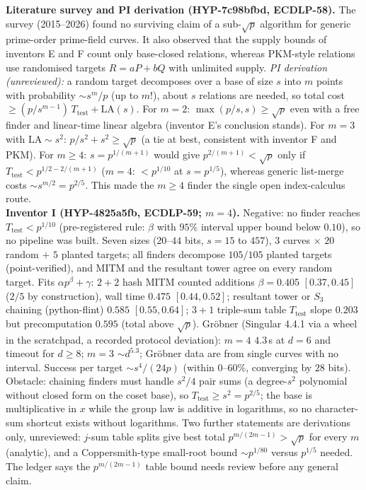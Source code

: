\documentclass[11pt,a4paper]{article}
\theoremstyle{remark}
\begin{document}
\textbf{Literature survey and PI derivation (\mbox{HYP-7c98bfbd}, ECDLP-58).} The survey (2015--2026) found no surviving claim of a sub-$\sqrt p$ algorithm for generic prime-order prime-field curves. It also observed that the supply bounds of inventors E and F count only base-closed relations, whereas PKM-style relations use randomised targets $R=aP+bQ$ with unlimited supply. \emph{PI derivation (unreviewed):} a random target decomposes over a base of size $s$ into $m$ points with probability $\sim s^m/p$ (up to $m!$), about $s$ relations are needed, so total cost $\ge(p/s^{m-1})\,T_{\mathrm{test}}+\mathrm{LA}(s)$. For $m=2$: $\max(p/s,s)\ge\sqrt p$ even with a free finder and linear-time linear algebra (inventor E's conclusion stands). For $m=3$ with $\mathrm{LA}\sim s^2$: $p/s^2+s^2\ge\sqrt p$ (a tie at best, consistent with inventor F and PKM). For $m\ge4$: $s=p^{1/(m+1)}$ would give $p^{2/(m+1)}<\sqrt p$ only if $T_{\mathrm{test}}<p^{1/2-2/(m+1)}$ ($m=4$: $<p^{1/10}$ at $s=p^{1/5}$), whereas generic list-merge costs $\sim s^{m/2}=p^{2/5}$. This made the $m\ge4$ finder the single open index-calculus route.\\
\textbf{Inventor I (\mbox{HYP-4825a5fb}, ECDLP-59; $m=4$).} Negative: no finder reaches $T_{\mathrm{test}}<p^{1/10}$ (pre-registered rule: $\beta$ with $95\%$ interval upper bound below $0.10$), so no pipeline was built. Seven sizes ($20$--$44$ bits, $s=15$ to $457$), $3$ curves $\times$ $20$ random $+$ $5$ planted targets; all finders decompose $105/105$ planted targets (point-verified), and MITM and the resultant tower agree on every random target. Fits $\alpha p^\beta+\gamma$: $2{+}2$ hash MITM counted additions $\beta=0.405$ $[0.37,0.45]$ ($2/5$ by construction), wall time $0.475$ $[0.44,0.52]$; resultant tower or $S_3$ chaining (python-flint) $0.585$ $[0.55,0.64]$; $3{+}1$ triple-sum table $T_{\mathrm{test}}$ slope $0.203$ but precomputation $0.595$ (total above $\sqrt p$). Gr\"obner (Singular 4.4.1 via a wheel in the scratchpad, a recorded protocol deviation): $m=4$ $4.3$\,s at $d=6$ and timeout for $d\ge8$; $m=3$ $\sim d^{5.3}$; Gr\"obner data are from single curves with no interval. Success per target $\sim s^4/(24p)$ (within $0$--$60\%$, converging by $28$ bits). Obstacle: chaining finders must handle $s^2/4$ pair sums (a degree-$s^2$ polynomial without closed form on the coset base), so $T_{\mathrm{test}}\ge s^2=p^{2/5}$; the base is multiplicative in $x$ while the group law is additive in logarithms, so no character-sum shortcut exists without logarithms. Two further statements are derivations only, unreviewed: $j$-sum table splits give best total $p^{m/(2m-1)}>\sqrt p$ for every $m$ (analytic), and a Coppersmith-type small-root bound $\sim p^{1/80}$ versus $p^{1/5}$ needed. The ledger says the $p^{m/(2m-1)}$ table bound needs review before any general claim.\\
\end{document}
